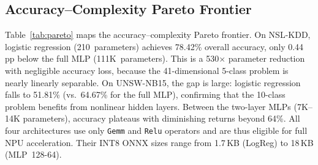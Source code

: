\documentclass[10pt,twocolumn]{article}
\begin{document}
\subsection{Accuracy--Complexity Pareto Frontier}
\label{sec:pareto}

\begin{table}[t]
\centering
\caption{Accuracy--complexity Pareto frontier (\%, mean$\pm$std).
Baselines: 10 seeds; full MLP: 20 seeds (NSL-KDD) / 20 seeds (UNSW).
All models are NPU-deployable (Gemm+Relu only).}
\label{tab:pareto}
\small
{}
\end{table}

Table~\ref{tab:pareto} maps the accuracy--complexity Pareto frontier.
On NSL-KDD, logistic regression (210~parameters) achieves 78.42\%
overall accuracy, only 0.44\,pp below the full MLP (111K~parameters).
This is a 530$\times$ parameter reduction with negligible accuracy
loss, because the 41-dimensional 5-class problem is nearly linearly
separable.
On UNSW-NB15, the gap is large: logistic regression falls to 51.81\%
(vs.\ 64.67\% for the full MLP), confirming that the 10-class problem
benefits from nonlinear hidden layers.
Between the two-layer MLPs (7K--14K parameters), accuracy plateaus
with diminishing returns beyond 64\%.
All four architectures use only \texttt{Gemm} and \texttt{Relu}
operators and are thus eligible for full NPU acceleration.
Their INT8 ONNX sizes range from 1.7\,KB (LogReg) to 18\,KB
(MLP~128-64).
\end{document}
